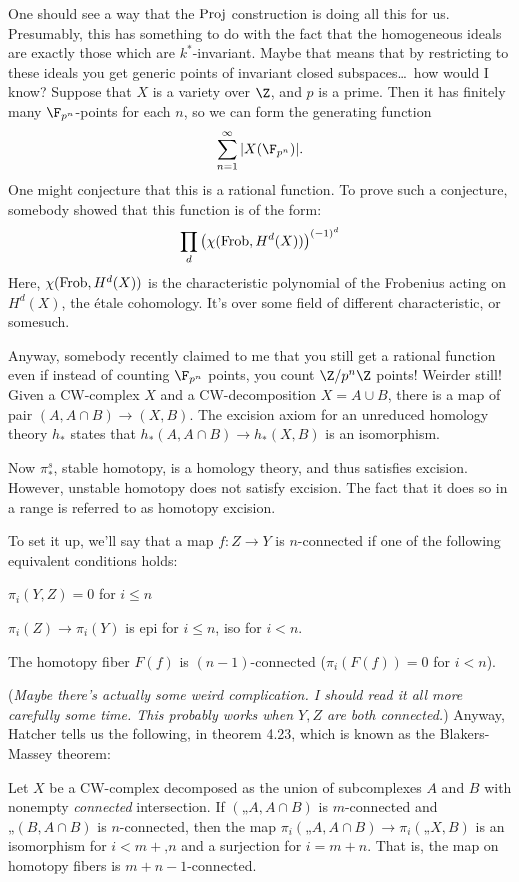 \documentclass[11pt]{article}
\begin{document}
\begin{FirstTen}
One should see a way that the $\operatorname{Proj}$ construction is doing all this for us.
Presumably, this has something to do with the fact that the homogeneous ideals
are exactly those which are $k^*$-invariant. Maybe that means that by
restricting to these ideals you get generic points of invariant closed
subspaces\ldots\ how would I know?
Suppose that $X$ is a variety over $\Z$, and $p$ is a prime. Then it has
finitely many $\F_{p^n}$-points for each $n$, so we can form the generating
function
\[\sum_{n=1}^\infty|X(\F_{p^n})|.\]
One might conjecture that this is a rational function. To prove such a
conjecture, somebody showed that this function is of the form:
\[\prod_{d}\left(\chi(\operatorname{Frob},H^d(X))\right)^{(-1)^d}\]
Here, $\chi(\operatorname{Frob},H^d(X))$ is the characteristic polynomial of the Frobenius
acting on $H^d(X)$, the \'etale cohomology. It's over some field of different
characteristic, or somesuch.

Anyway, somebody recently claimed to me that you still get a rational function
even if instead of counting $\F_{p^n}$ points, you count $\Z/p^n\Z$ points!
Weirder still!
Given a CW-complex $X$ and a CW-decomposition $X=A\cup B$, there is a map of
pair $(A,A\cap B)\to (X,B)$. The excision axiom for an unreduced homology theory
$h_*$ states that $h_*(A,A\cap B)\to h_*(X,B)$ is an isomorphism.

Now $\pi_*^s$, stable homotopy, is a homology theory, and thus satisfies
excision. However, unstable homotopy does not satisfy excision. The fact that it
does so in a range is referred to as homotopy excision.

To set it up, we'll say that a map $f:Z\to Y$ is $n$-connected if one of the
following equivalent conditions holds:
\begin{itemise}
\item $\pi_i(Y,Z)=0$ for $i\leq n$
\item $\pi_i(Z)\to\pi_i(Y)$ is epi for $i\leq n$, iso for $i<n$.
\item The homotopy fiber $F(f)$ is $(n-1)$-connected ($\pi_i(F(f))=0$ for
$i<n$).
\end{itemise}
{\small (\emph{Maybe there's actually some weird complication. I should read it
all more carefully some time. This probably works when $Y,Z$ are both
connected.})} Anyway, Hatcher tells us the following, in theorem 4.23, which is
known as the Blakers-Massey theorem:
\begin{thm*}Let $X$ be a CW-complex decomposed as the union of subcomplexes $A$
and $B$ with nonempty \emph{connected} intersection. If $(A,A\cap B)$ is
$m$-connected and $(B,A\cap B)$ is $n$-connected, then the map
$\pi_i(A,A\cap B)\to\pi_i(X,B)$ is an isomorphism for $i<m+n$ and a
surjection for $i= m+n$. That is, the map on homotopy fibers is
$m+n-1$-connected.
\end{thm*}


\end{FirstTen}
\end{document}
